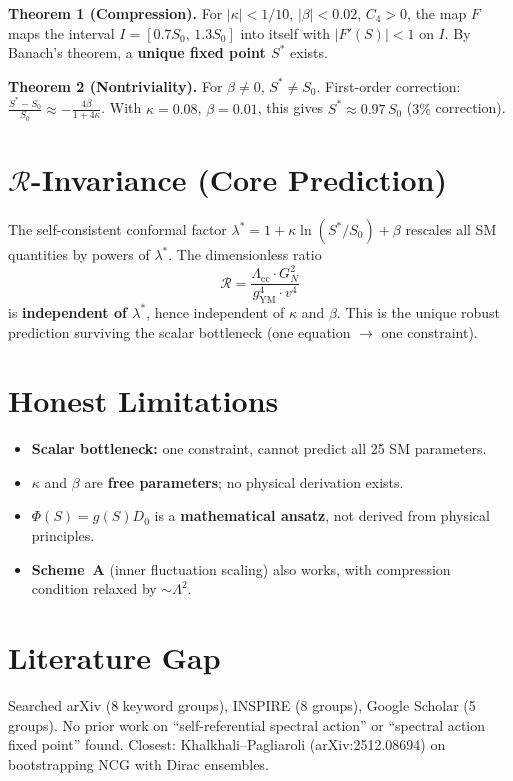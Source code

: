 ﻿\documentclass[11pt,a4paper]{article}
\begin{document}
\noindent\textbf{Theorem 1 (Compression).}
For $|\kappa|<1/10$, $|\beta|<0.02$, $C_4>0$, the map $F$ maps the interval
$I=[0.7S_0,\,1.3S_0]$ into itself with $|F'(S)|<1$ on $I$.
By Banach's theorem, a \textbf{unique fixed point $S^*$} exists.

\noindent\textbf{Theorem 2 (Nontriviality).}
For $\beta\neq0$, $S^*\neq S_0$.
First-order correction:
$\displaystyle \frac{S^*-S_0}{S_0} \approx -\frac{4\beta}{1+4\kappa}$.
With $\kappa=0.08$, $\beta=0.01$, this gives $S^*\approx 0.97\,S_0$ ($3\%$ correction).

\section*{$\mathcal{R}$-Invariance (Core Prediction)}

The self-consistent conformal factor $\lambda^*=1+\kappa\ln(S^*/S_0)+\beta$
rescales all SM quantities by powers of $\lambda^*$.
The dimensionless ratio
\[
\boxed{\;\mathcal{R} = \frac{\Lambda_{\mathrm{cc}}\cdot G_N^2}{g_{\mathrm{YM}}^4\cdot v^4}\;}
\]
is \textbf{independent of $\lambda^*$}, hence independent of $\kappa$ and $\beta$.
This is the unique robust prediction surviving the scalar bottleneck
(one equation $\to$ one constraint).

\section*{Honest Limitations}

\begin{itemize}
\item \textbf{Scalar bottleneck:} one constraint, cannot predict all 25 SM parameters.
\item $\kappa$ and $\beta$ are \textbf{free parameters}; no physical derivation exists.
\item $\Phi(S)=g(S)D_0$ is a \textbf{mathematical ansatz}, not derived from physical principles.
\item \textbf{Scheme~A} (inner fluctuation scaling) also works, with compression condition
  relaxed by $\sim\Lambda^2$.
\end{itemize}

\section*{Literature Gap}

Searched arXiv (8 keyword groups), INSPIRE (8 groups), Google Scholar (5 groups).
No prior work on ``self-referential spectral action'' or ``spectral action fixed point'' found.
Closest: Khalkhali--Pagliaroli (arXiv:2512.08694) on bootstrapping NCG with Dirac ensembles.
\end{document}
